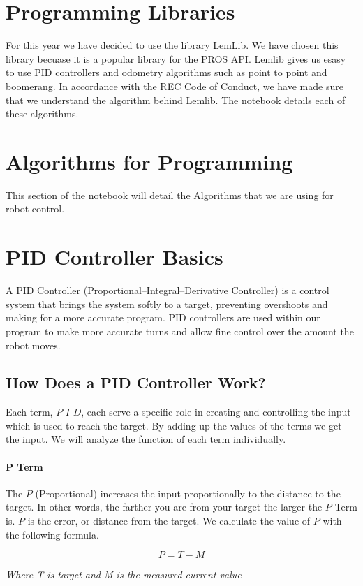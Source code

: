 \documentclass[12pt]{article}
\begin{document}
\section{Programming Libraries}
For this year we have decided to use the library LemLib. We have chosen this library becuase it is a popular library for the PROS API. Lemlib gives us esasy to use PID controllers and odometry algorithms such as point to point and boomerang. In accordance with the REC Code of Conduct, we have made sure that we understand the algorithm behind Lemlib. The notebook details each of these algorithms.

\section*{Algorithms for Programming}
This section of the notebook will detail the Algorithms that we are using for robot control.
\section{PID Controller Basics}
    A PID Controller (Proportional–Integral–Derivative Controller) is a control system that brings the system softly to a target, preventing overshoots and making for a more accurate program. PID controllers are used within our program to make more accurate turns and allow fine control over the amount the robot moves.

\subsection{How Does a PID Controller Work?} \label{howPID}
    Each term, $P$ $I$ $D$, each serve a specific role in creating and controlling the input which is used to reach the target. By adding up the values of the terms we get the input. We will analyze the function of each term individually.

\paragraph{P Term}
    The $P$ (Proportional) increases the input proportionally to the distance to the target. In other words, the farther you are from your target the larger the $P$ Term is. $P$ is the error, or distance from the target. We calculate the value of $P$ with the following formula.

    $$ P = T - M$$
    \begin{center}\em{Where T is target and M is the measured current value}\end{center}
\end{document}
